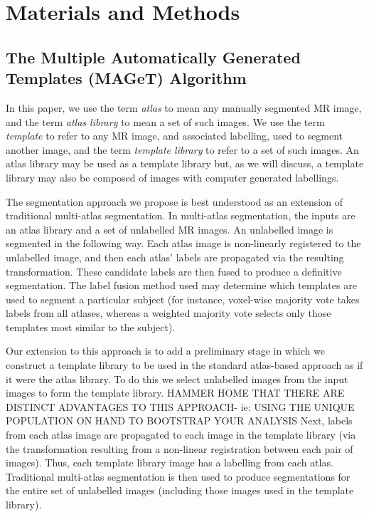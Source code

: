 \documentclass{article}
\begin{document}
\section{Materials and Methods} 
\subsection{The Multiple Automatically Generated Templates (MAGeT) Algorithm}

In this paper, we use the term {\it atlas} to mean any manually segmented MR
image, and the term {\it atlas library} to mean a set of such images.  We use
the term {\it template} to refer to any MR image, and associated labelling,
used to segment another image, and the term {\it template library} to refer to
a set of such images.  An atlas library may be used as a template library but,
as we will discuss, a template library may also be composed of images with
computer generated labellings. 

The segmentation approach we propose is best understood as an extension of
traditional multi-atlas segmentation.  In multi-atlas segmentation, the inputs
are an atlas library and a set of unlabelled MR images.  An unlabelled image is
segmented in the following way.  Each atlas image is non-linearly registered to
the unlabelled image, and then each atlas' labels are propagated via the
resulting transformation.  These candidate labels are then fused to produce a
definitive segmentation. The label fusion method used may determine which
templates are used to segment a particular subject (for instance, voxel-wise
majority vote takes labels from all atlases, whereas a weighted majority vote
selects only those templates most similar to the subject). 

Our extension to this approach is to add a preliminary stage in which we
construct a template library to be used in the standard atlas-based approach as
if it were the atlas library.  To do this we select unlabelled images from the
input images to form the template library.  {HAMMER HOME THAT THERE ARE DISTINCT ADVANTAGES TO THIS APPROACH- ie: USING THE UNIQUE POPULATION ON HAND TO BOOTSTRAP YOUR ANALYSIS}  Next, labels from each atlas image
are propagated to each image in the template library (via the transformation
resulting from a non-linear registration between each pair of images).
Thus, each template library image has a labelling from each atlas.  Traditional
multi-atlas segmentation is then used to produce segmentations for the entire
set of unlabelled images (including those images used in the template library). 
 
\end{document}
